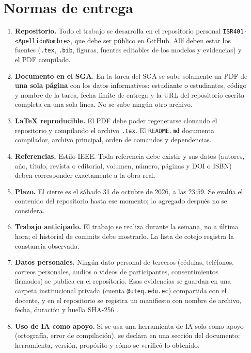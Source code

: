 \documentclass[11pt]{article}
\newcommand{\seccion}[1]{\section{\textcolor{utegreendk}{#1}}}
\begin{document}
\seccion{Normas de entrega}

\begin{enumerate}[leftmargin=20pt,itemsep=3pt]
	\item \textbf{Repositorio.} Todo el trabajo se desarrolla en el repositorio personal \texttt{ISR401-<ApellidoNombre>}, que debe ser público en GitHub. Allí deben estar los fuentes (\texttt{.tex}, \texttt{.bib}, figuras, fuentes editables de los modelos y evidencias) y el PDF compilado.
	\item \textbf{Documento en el SGA.} En la tarea del SGA se sube solamente un PDF de \textbf{una sola página} con los datos informativos: estudiante o estudiantes, código y nombre de la tarea, fecha límite de entrega y la URL del repositorio escrita completa en una sola línea. No se sube ningún otro archivo.
	\item \textbf{\LaTeX{} reproducible.} El PDF debe poder regenerarse clonando el repositorio y compilando el archivo \texttt{.tex}. El \texttt{README.md} documenta compilador, archivo principal, orden de comandos y dependencias.
	\item \textbf{Referencias.} Estilo IEEE. Toda referencia debe existir y sus datos (autores, año, título, revista o editorial, volumen, número, páginas y DOI o ISBN) deben corresponder exactamente a la obra real.
	\item \textbf{Plazo.} El cierre es el sábado 31 de octubre de 2026, a las 23:59. Se evalúa el contenido del repositorio hasta ese momento; lo agregado después no se considera.
	\item \textbf{Trabajo anticipado.} El trabajo se realiza durante la semana, no a última hora; el historial de commits debe mostrarlo. La lista de cotejo registra la constancia observada.
	\item \textbf{Datos personales.} Ningún dato personal de terceros (cédulas, teléfonos, correos personales, audios o videos de participantes, consentimientos firmados) se publica en el repositorio. Esas evidencias se guardan en una carpeta institucional privada (cuenta \texttt{@uteq.edu.ec}) compartida con el docente, y en el repositorio se registra un manifiesto con nombre de archivo, fecha, duración y huella SHA-256 \citep{lopdp_2021}.
	\item \textbf{Uso de IA como apoyo.} Si se usa una herramienta de IA solo como apoyo (ortografía, error de compilación), se declara en una sección del documento: herramienta, versión, propósito y cómo se verificó lo obtenido.
\end{enumerate}
\end{document}
